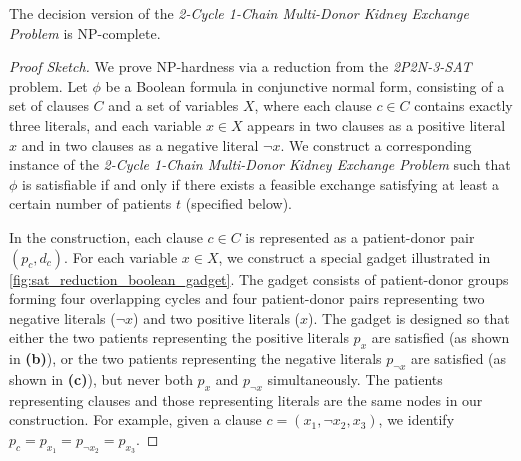 \begin{lemma}
\label{lemma:2c1c_npc}
The decision version of the \textit{2-Cycle 1-Chain Multi-Donor Kidney Exchange Problem} is NP-complete.
\end{lemma}

\begin{proof}[Proof Sketch]
We prove NP-hardness via a reduction from the \textit{2P2N-3-SAT} problem. Let $\phi$ be a Boolean formula in conjunctive normal form, consisting of a set of clauses $C$ and a set of variables $X$, where each clause $c \in C$ contains exactly three literals, and each variable $x \in X$ appears in two clauses as a positive literal $x$ and in two clauses as a negative literal $\neg{x}$. We construct a corresponding instance of the \textit{2-Cycle 1-Chain Multi-Donor Kidney Exchange Problem} such that $\phi$ is satisfiable if and only if there exists a feasible exchange satisfying at least a certain number of patients $t$ (specified below).

In the construction, each clause $c \in C$ is represented as a patient-donor pair $(p_c, d_c)$. For each variable $x \in X$, we construct a special gadget illustrated in \autoref{fig:sat_reduction_boolean_gadget}. The gadget consists of patient-donor groups forming four overlapping cycles and four patient-donor pairs representing two negative literals ($\neg{x}$) and two positive literals ($x$). The gadget is designed so that either the two patients representing the positive literals $p_x$ are satisfied (as shown in \textbf{(b)}), or the two patients representing the negative literals $p_{\neg{x}}$ are satisfied (as shown in \textbf{(c)}), but never both $p_x$ and $p_{\neg{x}}$ simultaneously. The patients representing clauses and those representing literals are the same nodes in our construction. For example, given a clause $c = (x_1, \neg{x_2}, x_3)$, we identify $p_c = p_{x_1} = p_{\neg{x_2}} = p_{x_3}$.


\end{proof}
